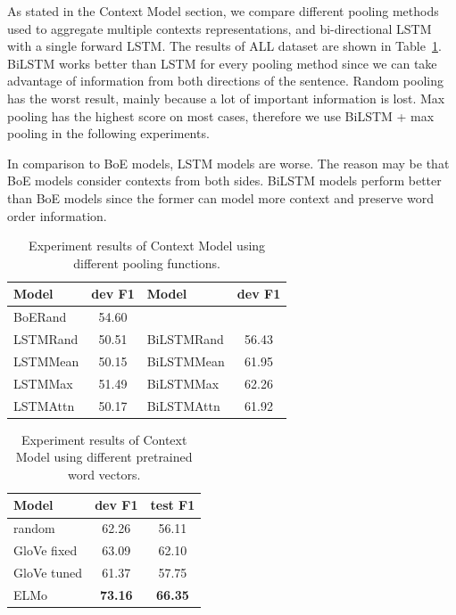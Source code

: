 \documentclass[letterpaper]{article} %
\begin{document}
As stated in the Context Model section, we compare different pooling methods used to aggregate multiple contexts representations, and bi-directional LSTM with a single forward LSTM. The results of ALL dataset are shown in Table~\ref{table:contextresult}. BiLSTM works better than LSTM for every pooling method since we can take advantage of information from both directions of the sentence. Random pooling has the worst result, mainly because a lot of important information is lost. Max pooling has the highest score on most cases, therefore we use BiLSTM + max pooling in the following experiments.

In comparison to BoE models, LSTM models are worse. The reason may be that BoE models consider contexts from both sides. BiLSTM models perform better than BoE models since the former can model more context and preserve word order information.

\begin{table}[t]
\centering
\begin{tabular}{l c | l c}
\hline 
{\bf Model} & {\bf dev F1 } & {\bf Model} & {\bf dev F1} \\ 
\hline\hline
BoERand & 54.60 && \\
\hline
LSTMRand & 50.51 & BiLSTMRand & 56.43 \\
LSTMMean & 50.15 & BiLSTMMean & 61.95 \\
LSTMMax & 51.49 & BiLSTMMax  & 62.26 \\
LSTMAttn & 50.17 & BiLSTMAttn & 61.92 \\ 
\hline
\end{tabular}
\caption{Experiment results of Context Model using different pooling functions.}
\label{table:contextresult}
\end{table}

\begin{table}[t]
\centering
\begin{tabular}{l c c} 
\hline
{\bf Model}  & {\bf dev F1 } & {\bf test F1 } \\
\hline\hline
random  &  62.26  & 56.11 \\ 
GloVe fixed  & 63.09  & 62.10 \\
GloVe tuned  & 61.37  & 57.75  \\
ELMo  & {\bf 73.16} & {\bf 66.35} \\
\hline
\end{tabular}
\caption{Experiment results of Context Model using different pretrained word vectors.}
\label{table:pretrain}
\end{table}
\end{document}
